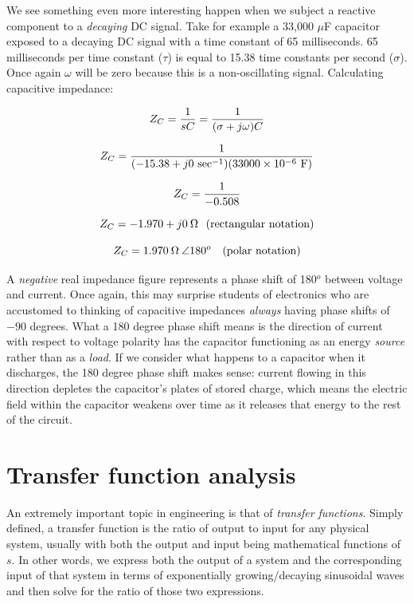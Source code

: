 \vskip 10pt

\filbreak

We see something even more interesting happen when we subject a reactive component to a \textit{decaying} DC signal.  Take for example a 33,000 $\mu$F capacitor exposed to a decaying DC signal with a time constant of 65 milliseconds.  65 milliseconds per time constant ($\tau$) is equal to 15.38 time constants per second ($\sigma$).  Once again $\omega$ will be zero because this is a non-oscillating signal.  Calculating capacitive impedance:

$$Z_C = {1 \over sC} = {1 \over (\sigma + j \omega) C}$$

$$Z_C = {1 \over (-15.38 + j 0 \hbox{ sec}^{-1}) (33000 \times 10^{-6} \hbox{ F})}$$

$$Z_C = {1 \over -0.508}$$

$$Z_C = -1.970 + j 0 \> \Omega \hbox{\hskip 7pt (rectangular notation)}$$

$$Z_C = 1.970 \> \Omega \> \angle 180^{o} \hbox{\hskip 10pt (polar notation)}$$

A \textit{negative} real impedance figure represents a phase shift of 180$^{o}$ between voltage and current.  Once again, this may surprise students of electronics who are accustomed to thinking of capacitive impedances \textit{always} having phase shifts of $-90$ degrees.  What a 180 degree phase shift means is the direction of current with respect to voltage polarity has the capacitor functioning as an energy \textit{source} rather than as a \textit{load}.  If we consider what happens to a capacitor when it discharges, the 180 degree phase shift makes sense: current flowing in this direction depletes the capacitor's plates of stored charge, which means the electric field within the capacitor weakens over time as it releases that energy to the rest of the circuit.








\filbreak
\section{Transfer function analysis}

An extremely important topic in engineering is that of \textit{transfer functions}.  Simply defined, a transfer function is the ratio of output to input for any physical system, usually with both the output and input being mathematical functions of $s$.  In other words, we express both the output of a system and the corresponding input of that system in terms of exponentially growing/decaying sinusoidal waves and then solve for the ratio of those two expressions.    

